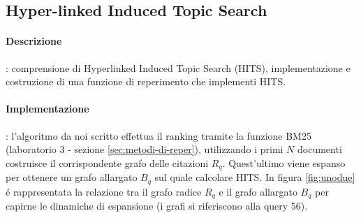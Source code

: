 \subsection{Hyper-linked Induced Topic Search}
\label{sec:hits}

\paragraph{\textbf{Descrizione}}: comprensione di Hyperlinked Induced Topic Search (\textsc{HITS}), implementazione e costruzione di una funzione di reperimento che implementi \textsc{HITS}.

\paragraph{\textbf{Implementazione}}: l'algoritmo da noi scritto effettua il ranking tramite la funzione BM25 (laboratorio 3 - sezione \ref{sec:metodi-di-reper}), utilizzando i primi $N$ documenti costruisce il corrispondente grafo delle citazioni $R_q$. Quest'ultimo viene espanso per ottenere un grafo allargato $B_q$ sul quale calcolare \textsc{HITS}.
In figura \ref{fig:unodue} \'e rappresentata la relazione tra il grafo radice $R_q$ e il grafo allargato $B_q$ per capirne le dinamiche di espansione (i grafi si riferiscono alla query $56$).
